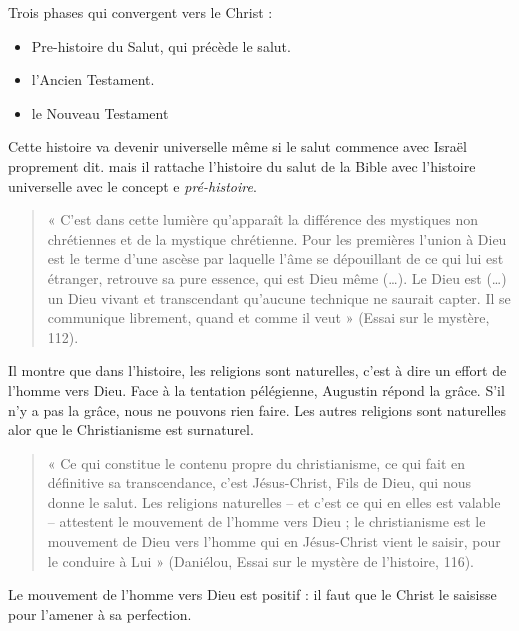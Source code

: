      Trois phases qui convergent vers le Christ : 
     \begin{itemize}
         \item Pre-histoire du Salut, qui précède le salut. 
         \item l'Ancien Testament. 
         \item le Nouveau Testament
     \end{itemize}
      Cette histoire va devenir universelle même si le salut commence avec Israël proprement dit. mais il rattache l'histoire du salut de la Bible avec l'histoire universelle avec le concept e \textit{pré-histoire}. 
      
      \begin{quote}
    «  C’est  dans  cette  lumière  qu’apparaît  la  différence  des  mystiques  non  chrétiennes  et  de  la  mystique chrétienne.  Pour  les  premières  l’union  à  Dieu  est  le  terme  d’une  ascèse  par  laquelle  l’âme  se dépouillant  de  ce  qui  lui  est  étranger,  retrouve  sa  pure  essence,  qui  est  Dieu  même  (…).  Le  Dieu  est  (…)    un  Dieu  vivant  et  transcendant  qu’aucune  technique  ne  saurait  capter.  Il  se communique  librement,  quand  et  comme  il  veut  »  (Essai  sur  le  mystère, 112). 
\end{quote}
   
    
      
     
       Il montre que dans l'histoire, les religions sont naturelles, c'est à dire un effort de l'homme vers Dieu.  
    Face à la tentation pélégienne, Augustin répond la grâce. S'il n'y a pas la grâce, nous ne pouvons rien faire. 
    Les autres religions sont naturelles alor que le Christianisme est surnaturel.
    \begin{quote}
         «  Ce  qui  constitue  le  contenu  propre  du  christianisme,  ce  qui  fait  en  définitive  sa  transcendance,  c’est Jésus-Christ,  Fils  de  Dieu,  qui  nous  donne  le  salut.  Les  religions  naturelles  –  et  c’est  ce  qui  en  elles  est valable  –  attestent  le  mouvement  de  l’homme  vers  Dieu  ;  le  christianisme  est  le  mouvement  de  Dieu vers  l’homme  qui  en  Jésus-Christ  vient  le  saisir,  pour  le  conduire  à  Lui  »  (Daniélou,  Essai  sur  le mystère  de  l’histoire, 116). 
     \end{quote}
   
    Le mouvement de l'homme vers Dieu est positif : il faut que le Christ le saisisse pour l'amener à sa perfection.
    
